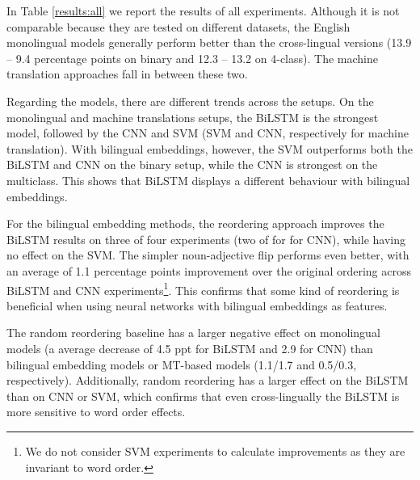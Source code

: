 \documentclass[11pt,a4paper]{article}
\newcommand{\F}{$\text{F}_1$\xspace}
\begin{document}
\begin{table*}[]
\begin{tabular}{lllcccccccccccc}
\bottomrule
\end{tabular}
\caption{Macro \F results for all corpora and techniques. We denote
  the best performing embedding-based
  method per column with a , the best monolingual method
  with a , and the best MT method with a . We do not denote bag-of-words SVM results, as they are invariant to word order. It's important to point out that the monolingual results are not comparable, as the models are tested on a smaller subset, rather than all the data.}
\label{results:all}
\end{table*}

In Table \ref{results:all} we report the results of all experiments. Although it is not comparable because they are tested on different datasets, the English monolingual models generally perform better than the cross-lingual versions (13.9 -- 9.4 percentage points on binary and 12.3 -- 13.2 on 4-class). The machine translation approaches fall in between these two.

Regarding the models, there are different trends across the setups. On the monolingual and machine translations setups, the BiLSTM is the strongest model, followed by the CNN and SVM (SVM and CNN, respectively for machine translation). With bilingual embeddings, however, the SVM outperforms both the BiLSTM and CNN on the binary setup, while the CNN is strongest on the multiclass. This shows that BiLSTM displays a different behaviour with bilingual embeddings.

For the bilingual embedding methods, the reordering approach improves the BiLSTM results on three of four experiments (two of for for CNN), while having no effect on the SVM. The simpler noun-adjective flip performs even better, with an average of 1.1 percentage points improvement over the original ordering across BiLSTM and CNN experiments\footnote{We do not consider SVM experiments to calculate improvements as they are invariant to word order.}. This confirms that some kind of reordering is beneficial when using neural networks with bilingual embeddings as features.

The random reordering baseline has a larger negative effect on monolingual models (a average decrease of 4.5 ppt for BiLSTM and 2.9 for CNN) than bilingual embedding models or MT-based models (1.1/1.7 and 0.5/0.3, respectively). Additionally, random reordering has a larger effect on the BiLSTM than on CNN or SVM, which confirms that even cross-lingually the BiLSTM is more sensitive to word order effects.
\end{document}
